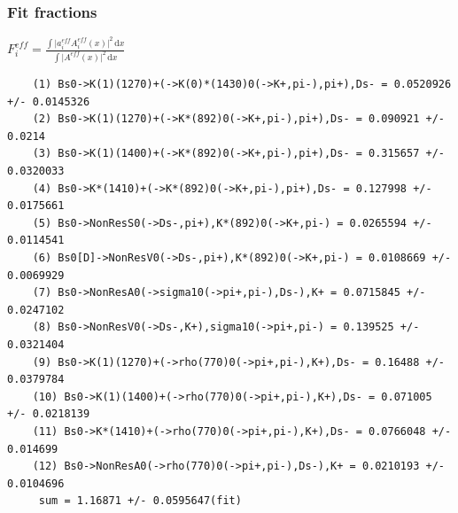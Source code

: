 \documentclass{beamer}
\begin{document}
\begin{frame}[fragile]
	\frametitle{Fit fractions}

	\centering
      $F^{eff}_i = \frac{\int  \vert a^{eff}_i  A^{eff}_i(x) \vert^2  \, \text{d}x}{\int  \vert A^{eff}(x) \vert^2 \, \text{d}x} $ \\


	\tiny
\begin{verbatim} 
	(1) Bs0->K(1)(1270)+(->K(0)*(1430)0(->K+,pi-),pi+),Ds- = 0.0520926 +/- 0.0145326
	(2) Bs0->K(1)(1270)+(->K*(892)0(->K+,pi-),pi+),Ds- = 0.090921 +/- 0.0214
	(3) Bs0->K(1)(1400)+(->K*(892)0(->K+,pi-),pi+),Ds- = 0.315657 +/- 0.0320033
	(4) Bs0->K*(1410)+(->K*(892)0(->K+,pi-),pi+),Ds- = 0.127998 +/- 0.0175661
	(5) Bs0->NonResS0(->Ds-,pi+),K*(892)0(->K+,pi-) = 0.0265594 +/- 0.0114541
	(6) Bs0[D]->NonResV0(->Ds-,pi+),K*(892)0(->K+,pi-) = 0.0108669 +/- 0.0069929
	(7) Bs0->NonResA0(->sigma10(->pi+,pi-),Ds-),K+ = 0.0715845 +/- 0.0247102
	(8) Bs0->NonResV0(->Ds-,K+),sigma10(->pi+,pi-) = 0.139525 +/- 0.0321404
	(9) Bs0->K(1)(1270)+(->rho(770)0(->pi+,pi-),K+),Ds- = 0.16488 +/- 0.0379784
	(10) Bs0->K(1)(1400)+(->rho(770)0(->pi+,pi-),K+),Ds- = 0.071005 +/- 0.0218139
	(11) Bs0->K*(1410)+(->rho(770)0(->pi+,pi-),K+),Ds- = 0.0766048 +/- 0.014699
	(12) Bs0->NonResA0(->rho(770)0(->pi+,pi-),Ds-),K+ = 0.0210193 +/- 0.0104696
	 sum = 1.16871 +/- 0.0595647(fit)
\end{verbatim}	
				
\end{frame}



%
%	
%	
%
\end{document}
